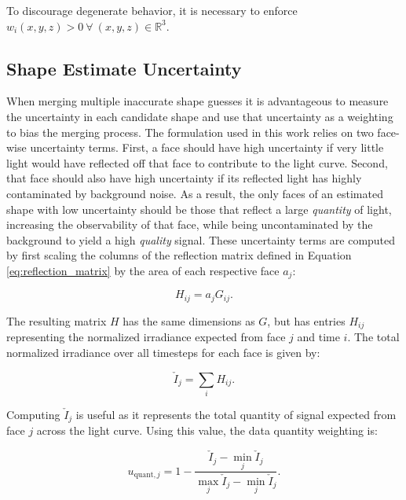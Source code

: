 To discourage degenerate behavior, it is necessary to enforce $w_i(x,y,z) > 0 \: \forall \: (x,y,z) \in \mathbb{R}^3$.

\subsection{Shape Estimate Uncertainty}

When merging multiple inaccurate shape guesses it is advantageous to measure the uncertainty in each candidate shape and use that uncertainty as a weighting to bias the merging process. The formulation used in this work relies on two face-wise uncertainty terms. First, a face should have high uncertainty if very little light would have reflected off that face to contribute to the light curve. Second, that face should also have high uncertainty if its reflected light has highly contaminated by background noise. As a result, the only faces of an estimated shape with low uncertainty should be those that reflect a large \textit{quantity} of light, increasing the observability of that face, while being uncontaminated by the background to yield a high \textit{quality} signal. These uncertainty terms are computed by first scaling the columns of the reflection matrix defined in Equation \ref{eq:reflection_matrix} by the area of each respective face $a_j$:

\begin{equation} \label{eq:h_matrix}
  H_{ij} = a_j G_{ij}.
\end{equation}

The resulting matrix $H$ has the same dimensions as $G$, but has entries $H_{ij}$ representing the normalized irradiance expected from face $j$ and time $i$. The total normalized irradiance over all timesteps for each face is given by:

\begin{equation} \label{eq:total_norm_irrad}
  \check{I}_{j} = \sum_{i}{H_{ij}}.
\end{equation}

Computing $\check{I}_{j}$ is useful as it represents the total quantity of signal expected from face $j$ across the light curve. Using this value, the data quantity weighting is:

\begin{equation} \label{eq:unc_quantity}
  u_{\mathrm{quant},j} = 1 - \frac{\check{I}_{j} - \min_{j}{\check{I}_{j}}}{\max_{j}{\check{I}_{j}} - \min_{j}{\check{I}_{j}}}.
\end{equation}

